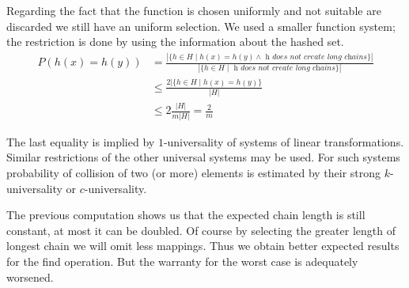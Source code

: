 Regarding the fact that the function is chosen uniformly and not suitable are discarded we still have an uniform selection. We used a smaller function system; the restriction is done by using the information about the hashed set.
\begin{displaymath}
\begin{split}
P(h(x) = h(y)) 
	& =  \frac{|\lbrace h \in H \mid h(x) = h(y) \wedge \textit{ h does not create long chains} \rbrace |}{|\lbrace h \in H \mid \textit{ h does not create long chains} \rbrace|} \\
	& \leq \frac{2 |\lbrace h \in H \mid h(x) = h(y) \rbrace}{|H|} \\
	& \leq 2 \frac{|H|}{m |H|} = \frac{2}{m}
\end{split}
\end{displaymath}

The last equality is implied by $1$-universality of systems of linear transformations. Similar restrictions of the other universal systems may be used. For such systems probability of collision of two (or more) elements is estimated by their strong $k$-universality or $c$-universality.

The previous computation shows us that the expected chain length is still constant, at most it can be doubled. Of course by selecting the greater length of longest chain we will omit less mappings. Thus we obtain better expected results for the find operation. But the warranty for the worst case is adequately worsened.
